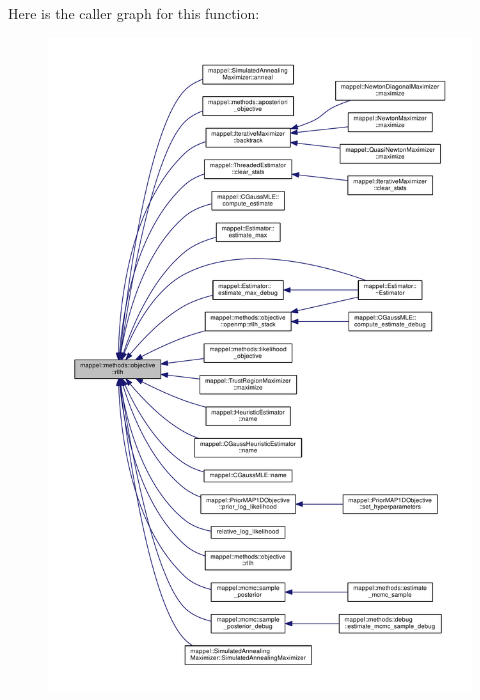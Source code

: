 Here is the caller graph for this function\+:\nopagebreak
\begin{figure}[H]
\begin{center}
\leavevmode
\includegraphics[width=350pt]{namespacemappel_1_1methods_1_1objective_a293c23ed6a623e59477bb67b6e40f5ad_icgraph}
\end{center}
\end{figure}


